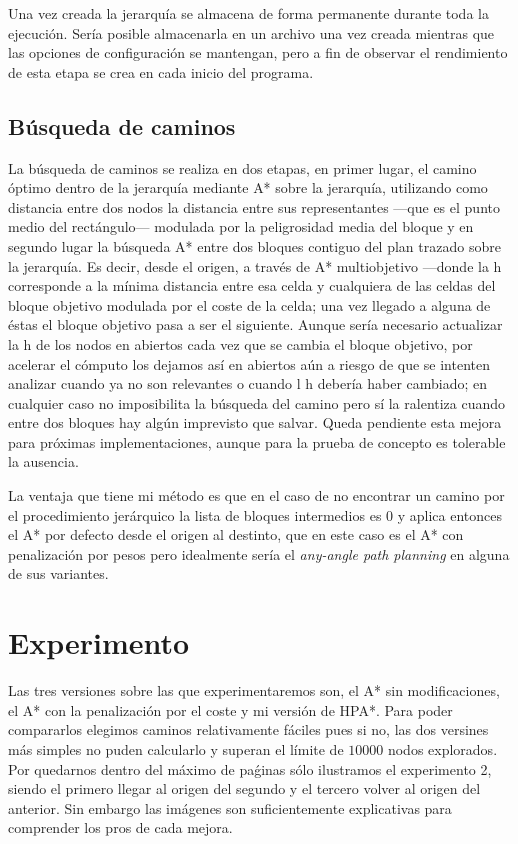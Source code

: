\documentclass{article}
\begin{document}
Una vez creada la jerarquía se almacena de forma permanente durante toda la ejecución. Sería posible almacenarla en un archivo una vez creada mientras que las opciones de configuración se mantengan, pero a fin de observar el rendimiento de esta etapa se crea en cada inicio del programa.

\subsection{Búsqueda de caminos}

La búsqueda de caminos se realiza en dos etapas, en primer lugar, el camino óptimo dentro de la jerarquía mediante A* sobre la jerarquía, utilizando como distancia entre dos nodos la distancia entre sus representantes ---que es el punto medio del rectángulo--- modulada por la peligrosidad media del bloque y en segundo lugar la búsqueda A* entre dos bloques contiguo del plan trazado sobre la jerarquía.
Es decir, desde el origen, a través de A* multiobjetivo ---donde la h corresponde a la mínima distancia entre esa celda y cualquiera de las celdas del bloque objetivo modulada por el coste de la celda; una vez llegado a alguna de éstas el bloque objetivo pasa a ser el siguiente. Aunque sería necesario actualizar la h de los nodos en abiertos cada vez que se cambia el bloque objetivo, por acelerar el cómputo los dejamos así en abiertos aún a riesgo de que se intenten analizar cuando ya no son relevantes o cuando l h debería haber cambiado; en cualquier caso no imposibilita la búsqueda del camino pero sí la ralentiza cuando entre dos bloques hay algún imprevisto que salvar. Queda pendiente esta mejora para próximas implementaciones, aunque para la prueba de concepto es tolerable la ausencia.

La ventaja que tiene mi método es que en el caso de no encontrar un camino por el procedimiento jerárquico la lista de bloques intermedios es 0 y aplica entonces el A* por defecto desde el origen al destinto, que en este caso es el A* con penalización por pesos pero idealmente sería el \emph{any-angle path planning} en alguna de sus variantes.
\section{Experimento}

Las tres versiones sobre las que experimentaremos son, el A* sin modificaciones, el A* con la penalización por el coste y mi versión de HPA*. Para poder compararlos elegimos caminos relativamente fáciles pues si no, las dos versines más simples no puden calcularlo y superan el límite de $10000$ nodos explorados. Por quedarnos dentro del máximo de paǵinas sólo ilustramos el experimento 2, siendo el primero llegar al origen del segundo y el tercero volver al origen del anterior. Sin embargo las imágenes son suficientemente explicativas para comprender los pros de cada mejora.
\end{document}
